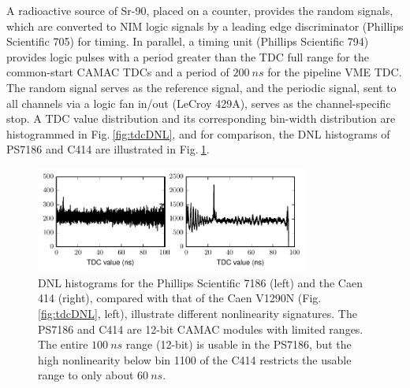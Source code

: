 A radioactive source of Sr-90, placed on a counter, provides the random signals, which are converted to NIM logic signals by a leading edge discriminator (Phillips Scientific 705) for timing. In parallel, a timing unit (Phillips Scientific 794) provides logic pulses with a period greater than the TDC full range for the common-start CAMAC TDCs and a period of $200\:ns$ for the pipeline VME TDC. The random signal serves as the reference signal, and the periodic signal, sent to all channels via a logic fan in/out (LeCroy 429A), serves as the channel-specific stop. A TDC value distribution and its corresponding bin-width distribution are histogrammed in Fig.$\:$\ref{fig:tdcDNL}, and for comparison, the DNL histograms of PS7186 and C414 are illustrated in Fig.$\:$\ref{fig:tdcDNLcamac}.

\begin{figure}[]
\centering
\includegraphics[width=0.8\textwidth]{evan/fig_evan_tdc_testing/tdc_dnl_camac.pdf} %
\caption{DNL histograms for the Phillips Scientific 7186 (left) and the Caen 414 (right), compared with that of the Caen V1290N (Fig.$\:$\ref{fig:tdcDNL}, left), illustrate different nonlinearity signatures. The PS7186 and C414 are 12-bit CAMAC modules with limited ranges. The entire $100\:ns$ range (12-bit) is usable in the PS7186, but the high nonlinearity below bin 1100 of the C414 restricts the usable range to only about $60\:ns$.\label{fig:tdcDNLcamac}}
\end{figure}

